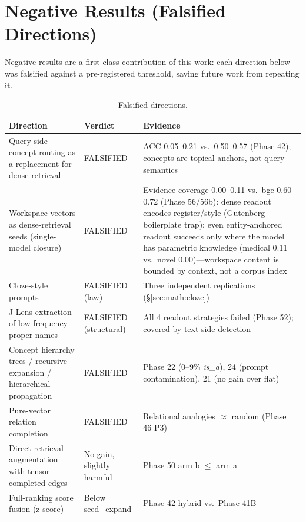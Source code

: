 \section{Negative Results (Falsified Directions)}
\label{sec:negative}

Negative results are a first-class contribution of this work: each direction
below was falsified against a pre-registered threshold, saving future work from
repeating it.

\begin{table}[h]
\centering
\caption{Falsified directions.}
\label{tab:negative}
\begin{tabular}{@{}p{5.2cm}lp{5.6cm}@{}}
\toprule
Direction & Verdict & Evidence \\
\midrule
Query-side concept routing as a replacement for dense retrieval & FALSIFIED &
ACC 0.05--0.21 vs.\ 0.50--0.57 (Phase 42); concepts are topical anchors, not
query semantics \\
Workspace vectors as dense-retrieval seeds (single-model closure) & FALSIFIED &
Evidence coverage 0.00--0.11 vs.\ bge 0.60--0.72 (Phase 56/56b): dense readout
encodes register/style (Gutenberg-boilerplate trap); even entity-anchored
readout succeeds only where the model has parametric knowledge (medical 0.11
vs.\ novel 0.00)---workspace content is bounded by context, not a corpus index \\
Cloze-style prompts & FALSIFIED (law) & Three independent replications
(\S\ref{sec:math:cloze}) \\
J-Lens extraction of low-frequency proper names & FALSIFIED (structural) &
All 4 readout strategies failed (Phase 52); covered by text-side detection \\
Concept hierarchy trees / recursive expansion / hierarchical propagation &
FALSIFIED & Phase 22 (0--9\% \emph{is\_a}), 24 (prompt contamination), 21
(no gain over flat) \\
Pure-vector relation completion & FALSIFIED & Relational analogies $\approx$
random (Phase 46 P3) \\
Direct retrieval augmentation with tensor-completed edges & No gain, slightly
harmful & Phase 50 arm b $\leq$ arm a \\
Full-ranking score fusion (z-score) & Below seed+expand & Phase 42 hybrid vs.\
Phase 41B \\
\bottomrule
\end{tabular}
\end{table}
